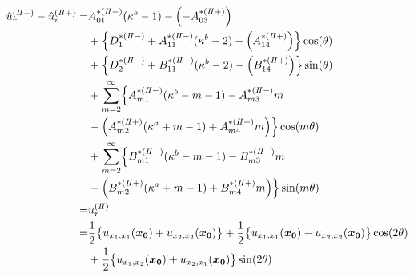 \begin{align}
	\hat{u}_{r}^{(I\hspace{-.15em}I-)}-\hat{u}_{r}^{(I\hspace{-.15em}I+)} =
	&A_{01}^{*(I\hspace{-.15em}I-)}(\kappa^{b}-1)-\Bigl(-A_{03}^{*(I\hspace{-.15em}I+)}\Bigr)
	\nonumber
	\\
	&+\Bigl\{D_{1}^{*(I\hspace{-.15em}I-)}+A_{11}^{*(I\hspace{-.15em}I-)}(\kappa^{b}-2)
	-\Bigl(A_{14}^{*(I\hspace{-.15em}I+)}\Bigr)\Bigr\}\cos(\theta)
	\nonumber
	\\
	&+\Bigl\{D_{2}^{*(I\hspace{-.15em}I-)}+B_{11}^{*(I\hspace{-.15em}I-)}(\kappa^{b}-2)
	-\Bigl(B_{14}^{*(I\hspace{-.15em}I+)}\Bigr)\Bigr\}\sin(\theta)
	\nonumber
	\\
	&+\sum_{m=2}^{\infty}\Bigl\{A_{m1}^{*(I\hspace{-.15em}I-)}(\kappa^{b}-m-1)
	-A_{m3}^{*(I\hspace{-.15em}I-)}m
	\nonumber
	\\
	&-\Bigl(A_{m2}^{*(I\hspace{-.15em}I+)}(\kappa^{a}+m-1)
	+A_{m4}^{*(I\hspace{-.15em}I+)}m\Bigr)\Bigr\}\cos(m\theta)
	\nonumber
	\\
	&+\sum_{m=2}^{\infty}\Bigl\{B_{m1}^{*(I\hspace{-.15em}I-)}(\kappa^{b}-m-1)
	-B_{m3}^{*(I\hspace{-.15em}I-)}m
	\nonumber
	\\
	&-\Bigl(B_{m2}^{*(I\hspace{-.15em}I+)}(\kappa^{a}+m-1)
	+B_{m4}^{*(I\hspace{-.15em}I+)}m\Bigr)\Bigr\}\sin(m\theta)
	\nonumber
	\\
	=&u_{r}^{(I\hspace{-.15em}I)}
	\nonumber
	\\
	=&\frac{1}{2}\bigl\{u_{x_{1},x_{1}}(\bm{x_{0}})+u_{x_{2},x_{2}}(\bm{x_{0}})\bigr\}
	+\frac{1}{2}\bigl\{u_{x_{1},x_{1}}(\bm{x_{0}})-u_{x_{2},x_{2}}(\bm{x_{0}})\bigr\}\cos(2\theta)
	\nonumber
	\\
	&+\frac{1}{2}\bigl\{u_{x_{1},x_{2}}(\bm{x_{0}})+u_{x_{2},x_{1}}(\bm{x_{0}})\bigr\}\sin(2\theta)
	\label{eq:UR2eq}
\end{align}

